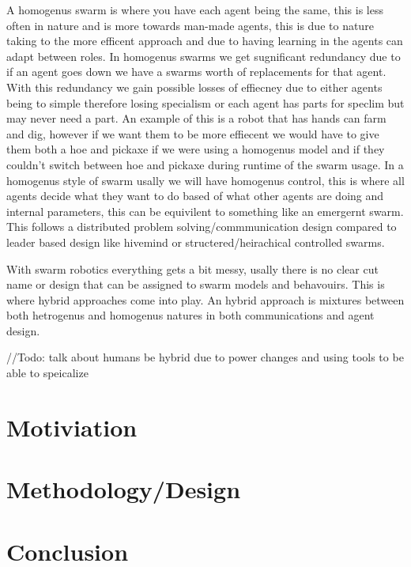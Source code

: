 \documentclass{UoYCSproject}
\begin{document}
A homogenus swarm is where you have each agent being the same, this is less often in nature and is more towards man-made agents, this is due to nature taking to the more efficent approach and due to having learning in the agents can adapt between roles.
In homogenus swarms we get sugnificant redundancy due to if an agent goes down we have a swarms worth of replacements for that agent.
With this redundancy we gain possible losses of effiecney due to either agents being to simple therefore losing specialism or each agent has parts for speclim but may never need a part.
An example of this is a robot that has hands can farm and dig, however if we want them to be more effiecent we would have to give them both a hoe and pickaxe if we were using a homogenus model and if they couldn't switch between hoe and pickaxe during runtime of the swarm usage.
In a homogenus style of swarm usally we will have homogenus control, this is where all agents decide what they want to do based of what other agents are doing and internal parameters, this can be equivilent to something like an emergernt swarm.
This follows a distributed problem solving/commmunication design compared to  leader based design like hivemind or structered/heirachical controlled swarms.

With swarm robotics everything gets a bit messy, usally there is no clear cut name or design that can be assigned to swarm models and behavouirs.
This is where hybrid approaches come into play.
An hybrid approach is mixtures between both hetrogenus and homogenus natures in both communications and agent design. 

//Todo: talk about humans be hybrid due to power changes and using tools to be able to speicalize




\chapter{Motiviation}
\label{cha:Motivation}


\chapter{Methodology/Design}
\label{cha:Methodology/Design}


\chapter{Conclusion}
\label{cha:conclusion}
\end{document}
